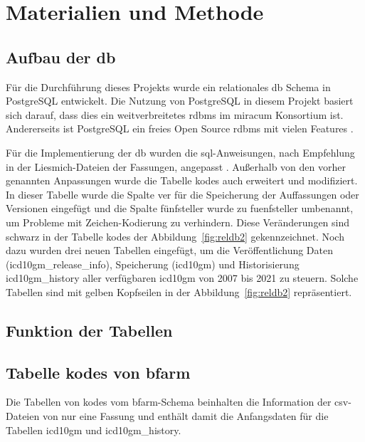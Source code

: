 \chapter{Materialien und Methode} \label{ch:database}

\section{Aufbau der \acs{db}} \label{sec:dbdevelop}

Für die Durchführung dieses Projekts wurde ein relationales \ac{db} Schema in PostgreSQL entwickelt. Die Nutzung von PostgreSQL in diesem Projekt basiert sich darauf, dass dies ein weitverbreitetes \ac{rdbms} im \ac{miracum} Konsortium ist. Andererseits ist PostgreSQL ein freies Open Source \ac{rdbms} mit vielen Features \cite{postgres}.

Für die Implementierung der \ac{db} wurden die \ac{sql}-Anweisungen, nach Empfehlung in der Liesmich-Dateien der Fassungen, angepasst \cite{readmel}. Außerhalb von den vorher genannten Anpassungen wurde die Tabelle \textsf{kodes} auch erweitert und modifiziert. In dieser Tabelle wurde die Spalte \textsf{ver} für die Speicherung der Auffassungen oder Versionen eingefügt und die Spalte \textsf{fünfsteller} wurde zu \textsf{fuenfsteller} umbenannt, um Probleme mit Zeichen-Kodierung zu verhindern. Diese Veränderungen sind schwarz in der Tabelle \textsf{kodes} der Abbildung~\ref{fig:reldb2} gekennzeichnet. Noch dazu wurden drei neuen Tabellen eingefügt, um die Veröffentlichung Daten (\textsf{icd10gm\_release\_info}), Speicherung (\textsf{icd10gm}) und Historisierung \textsf{icd10gm\_history} aller verfügbaren \ac{icd10gm} von 2007 bis 2021 zu steuern. Solche Tabellen sind mit gelben Kopfseilen in der Abbildung~\ref{fig:reldb2} repräsentiert.

\section{Funktion der Tabellen} \label{sec:functab}

\section{Tabelle \textsf{kodes} von \acs{bfarm}} \label{subsec:bfarmtables}

Die Tabellen von \textsf{kodes} vom \ac{bfarm}-Schema beinhalten die Information der \ac{csv}-Dateien von nur eine Fassung und enthält damit die Anfangsdaten für die Tabellen \textsf{icd10gm} und \textsf{icd10gm\_history}.

